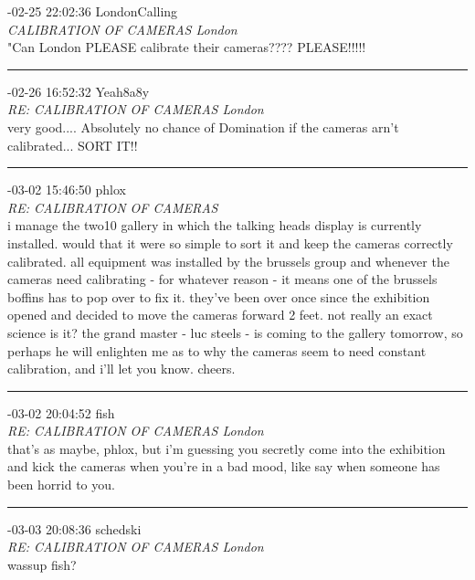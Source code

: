 \begin{mail}

{-02-25 22:02:36 LondonCalling}\\
{\itshape CALIBRATION OF CAMERAS London}\\
"Can London PLEASE calibrate their cameras???? PLEASE!!!!!\\

\rule{0.8\textwidth}{.4pt}

{-02-26 16:52:32 Yeah8a8y}\\
{\itshape RE: CALIBRATION OF CAMERAS London}\\
very good.... Absolutely no chance of Domination if the cameras arn't calibrated... SORT IT!!\\

\rule{0.8\textwidth}{.4pt}

{-03-02 15:46:50} phlox\\
{\itshape RE: CALIBRATION OF CAMERAS}\\
i manage the two10 gallery in which the talking heads display is currently installed. would that it were so simple to sort it and keep the cameras correctly calibrated. all equipment was installed by the brussels group and whenever the cameras need calibrating - for whatever reason - it means one of the brussels boffins has to pop over to fix it. they've been over once since the exhibition opened and decided to move the cameras forward 2 feet. not really an exact science is it? the grand master - luc steels - is coming to the gallery tomorrow, so perhaps he will enlighten me as to why the cameras seem to need constant calibration, and i'll let you know. cheers.\\

\rule{0.8\textwidth}{.4pt}

{-03-02 20:04:52 fish}\\
{\itshape RE: CALIBRATION OF CAMERAS London}\\
that's as maybe, phlox, but i'm guessing you secretly come into the exhibition and kick the cameras when 
you're in a bad mood, like say when someone has been horrid to you.\\

\rule{0.8\textwidth}{.4pt}

{-03-03 20:08:36 schedski}\\
{\itshape RE: CALIBRATION OF CAMERAS London}\\
wassup fish?\\


\end{mail}
